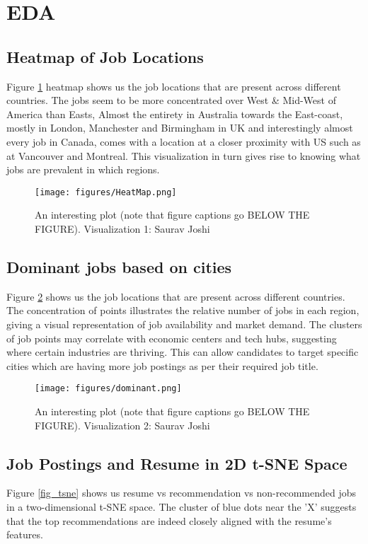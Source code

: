 \documentclass[a4paper,10pt]{article}
\begin{document}
\section{EDA}
    
 \subsection{Heatmap of Job Locations}

      Figure \ref{fig_heatmap} heatmap shows us the job locations that are present across different countries. The jobs seem to be more concentrated over West \& Mid-West of America than Easts, Almost the entirety in Australia towards the East-coast, mostly in London, Manchester and Birmingham in UK and interestingly almost every job in Canada, comes with a location at a closer proximity with US such as at Vancouver and Montreal. This visualization in turn gives rise to knowing what jobs are prevalent in which regions.

    \begin{figure}[ht]
    \centering
    \texttt{[image: figures/HeatMap.png]}
    \caption{An interesting plot (note that figure captions go BELOW THE FIGURE). Visualization 1: Saurav Joshi}
    \label{fig_heatmap}
    \end{figure}


 \subsection{Dominant jobs based on cities}
      Figure \ref{fig_dominant_jobs} shows us the job locations that are present across different countries. The concentration of points illustrates the relative number of jobs in each region, giving a visual representation of job availability and market demand. The clusters of job points may correlate with economic centers and tech hubs, suggesting where certain industries are thriving. This can allow candidates to target specific cities which are having more job postings as per their required job title.

    \begin{figure}[ht]
    \centering
    \texttt{[image: figures/dominant.png]}
    \caption{An interesting plot (note that figure captions go BELOW THE FIGURE). Visualization 2: Saurav Joshi}
    \label{fig_dominant_jobs}
    \end{figure}

 \subsection{Job Postings and Resume in 2D t-SNE Space}
      Figure \ref{fig_tsne} shows us resume vs recommendation vs non-recommended jobs in a two-dimensional t-SNE space. The cluster of blue dots near the 'X' suggests that the top recommendations are indeed closely aligned with the resume's features.
\end{document}
